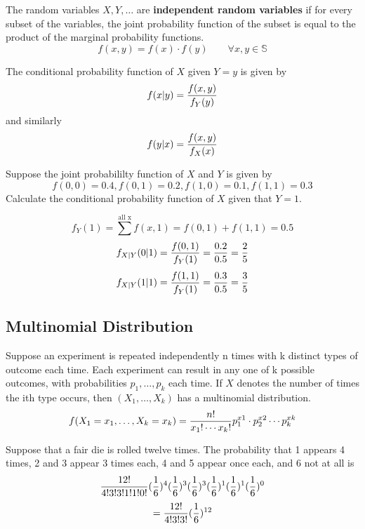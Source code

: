 \documentclass[english, 12pt]{article}
\begin{document}
\begin{defn}
The random variables $X,Y,\dots$ are \textbf{independent random variables} if for every subset of the variables, the joint probability function of the subset is equal to the product of the marginal probability functions.
\[f(x,y) = f(x) \cdot f(y)\qquad \forall x,y \in \mathbb{S}\]
\end{defn}

\begin{defn}
The conditional probability function of $X$ given $Y = y$ is given by
\[f(x|y) = \frac{f(x,y)}{f_Y(y)}\]
and similarly
\[f(y|x) = \frac{f(x,y)}{f_X(x)}\]
\end{defn}

\begin{exmp}
Suppose the joint probabililty function of $X$ and $Y$ is given by
\[f(0,0) = 0.4, f(0,1) = 0.2, f(1,0) = 0.1, f(1,1) = 0.3\]
Calculate the conditional probability function of $X$ given that $Y = 1$.

\begin{sol}
\[f_Y(1) = \sum^{\text{all x}} f(x,1) = f(0,1) + f(1,1) = 0.5\]
\[f_{X|Y}(0 | 1) = \frac{f(0,1)}{f_Y(1)} = \frac{0.2}{0.5} = \frac{2}{5}\]
\[f_{X|Y}(1|1) = \frac{f(1,1)}{f_Y(1)} = \frac{0.3}{0.5} = \frac{3}{5}\]
\end{sol}
\end{exmp}

\subsection{Multinomial Distribution}

Suppose an experiment is repeated independently n times with k distinct types of outcome each time. Each experiment can result in any one of k possible outcomes, with probabilities $p_1,\dots,p_k$ each time. If $X$ denotes the number of times the ith type occurs, then $(X_1,\dots,X_k)$ has a multinomial distribution.
\[f(X_1 = x_1,\dots,X_k = x_k) = \frac{n!}{x_1 !\cdots x_k !} p_{1}^{x1} \cdot p_{2}^{x2} \cdots p_{k}^{xk}\]

\begin{exmp}
Suppose that a fair die is rolled twelve times. The probability that 1 appears 4 times, 2 and 3 appear 3 times each, 4 and 5 appear once each, and 6 not at all is
\[\frac{12!}{4!3!3!1!1!0!} (\frac{1}{6})^4 (\frac{1}{6})^3 (\frac{1}{6})^3 (\frac{1}{6})^1 (\frac{1}{6})^1 (\frac{1}{6})^0\]
\[= \frac{12!}{4!3!3!} (\frac{1}{6})^{12}\]
\end{exmp}
\end{document}
